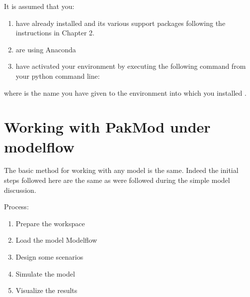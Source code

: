 \documentclass[letterpaper,10pt,english]{jupyterBook}
\begin{document}
\sphinxAtStartPar
It is assumed that you:
\begin{enumerate}
%
\item {} 
\sphinxAtStartPar
have already installed  and its various support packages following the instructions in Chapter 2.

\item {} 
\sphinxAtStartPar
are using Anaconda

\item {} 
\sphinxAtStartPar
have activated your  environment by executing the following command from your python command line:

\end{enumerate}

\begin{sphinxVerbatim}[commandchars=\\\{\}]
  
\end{sphinxVerbatim}

\sphinxAtStartPar
where  is the name you have given to the  environment into which you installed .


\chapter{Working with PakMod under modelflow}
\label{\detokenize{content/05_WBModels/LoadingWBModel:working-with-pakmod-under-modelflow}}
\sphinxAtStartPar
The basic method for working with any model is the same. Indeed the initial steps followed here are the same as were followed during the simple model discussion.

\sphinxAtStartPar
Process:
\begin{enumerate}
%
\item {} 
\sphinxAtStartPar
Prepare the workspace

\item {} 
\sphinxAtStartPar
Load the model Modelflow

\item {} 
\sphinxAtStartPar
Design some scenarios

\item {} 
\sphinxAtStartPar
Simulate the model

\item {} 
\sphinxAtStartPar
Visualize the results

\end{enumerate}
\end{document}
